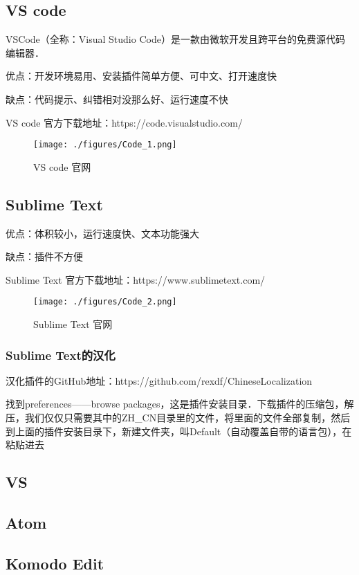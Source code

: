 
\subsection{VS code}

VSCode（全称：Visual Studio Code）是一款由微软开发且跨平台的免费源代码编辑器．

优点：开发环境易用、安装插件简单方便、可中文、打开速度快

缺点：代码提示、纠错相对没那么好、运行速度不快

VS code 官方下载地址：https://code.visualstudio.com/

\begin{figure}[ht]
\centering
\texttt{[image: ./figures/Code\_1.png]}
\caption{VS code 官网} \label{Code_fig1}
\end{figure}

\subsection{Sublime Text}

优点：体积较小，运行速度快、文本功能强大

缺点：插件不方便

Sublime Text 官方下载地址：https://www.sublimetext.com/

\begin{figure}[ht]
\centering
\texttt{[image: ./figures/Code\_2.png]}
\caption{Sublime Text 官网} \label{Code_fig2}
\end{figure}

\subsubsection{Sublime Text的汉化}

汉化插件的GitHub地址：https://github.com/rexdf/ChineseLocalization

找到preferences——browse packages，这是插件安装目录．下载插件的压缩包，解压，我们仅仅只需要其中的ZH_CN目录里的文件，将里面的文件全部复制，然后到上面的插件安装目录下，新建文件夹，叫Default（自动覆盖自带的语言包），在粘贴进去

\subsection{VS}

\subsection{Atom}

\subsection{Komodo Edit}

